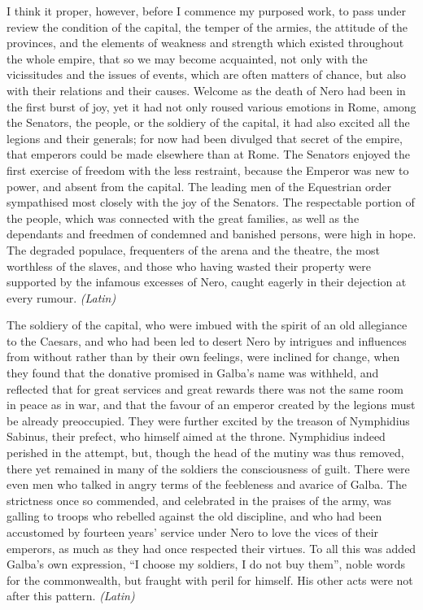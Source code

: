 
I think it proper, however, before I commence my purposed work, to pass under review the condition of the capital, the temper of the armies, the attitude of the provinces, and the elements of weakness and strength which existed throughout the whole empire, that so we may become acquainted, not only with the vicissitudes and the issues of events, which are often matters of chance, but also with their relations and their causes. Welcome as the death of Nero had been in the first burst of joy, yet it had not only roused various emotions in Rome, among the Senators, the people, or the soldiery of the capital, it had also excited all the legions and their generals; for now had been divulged that secret of the empire, that emperors could be made elsewhere than at Rome. The Senators enjoyed the first exercise of freedom with the less restraint, because the Emperor was new to power, and absent from the capital. The leading men of the Equestrian order sympathised most closely with the joy of the Senators. The respectable portion of the people, which was connected with the great families, as well as the dependants and freedmen of condemned and banished persons, were high in hope. The degraded populace, frequenters of the arena and the theatre, the most worthless of the slaves, and those who having wasted their property were supported by the infamous excesses of Nero, caught eagerly in their dejection at every rumour. \emph{(Latin)}


The soldiery of the capital, who were imbued with the spirit of an old allegiance to the Caesars, and who had been led to desert Nero by intrigues and influences from without rather than by their own feelings, were inclined for change, when they found that the donative promised in Galba's name was withheld, and reflected that for great services and great rewards there was not the same room in peace as in war, and that the favour of an emperor created by the legions must be already preoccupied. They were further excited by the treason of Nymphidius Sabinus, their prefect, who himself aimed at the throne. Nymphidius indeed perished in the attempt, but, though the head of the mutiny was thus removed, there yet remained in many of the soldiers the consciousness of guilt. There were even men who talked in angry terms of the feebleness and avarice of Galba. The strictness once so commended, and celebrated in the praises of the army, was galling to troops who rebelled against the old discipline, and who had been accustomed by fourteen years' service under Nero to love the vices of their emperors, as much as they had once respected their virtues. To all this was added Galba's own expression, ``I choose my soldiers, I do not buy them'', noble words for the commonwealth, but fraught with peril for himself. His other acts were not after this pattern. \emph{(Latin)}

